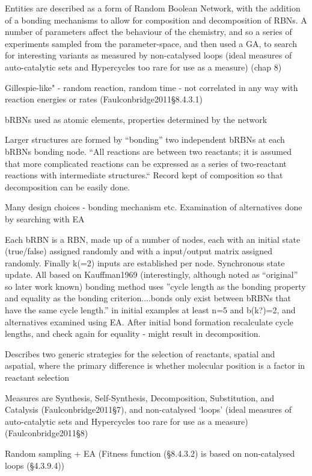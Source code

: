 Entities are described as a form of Random Boolean Network, with the addition of a bonding mechanisms to allow for composition and decomposition of RBNs. A number of parameters affect the behaviour of the chemistry, and so a series of experiments sampled from the parameter-space, and then used a GA, to search for interesting variants as measured by non-catalysed loops (ideal measures of auto-catalytic sets and Hypercycles too rare for use as a measure) (chap 8)

Gillespie-like" - random reaction, random time - not correlated in any way with reaction energies or rates (Faulconbridge2011§8.4.3.1)

bRBNs used as atomic elements, properties determined by the network

Larger structures are formed by ``bonding'' two independent bRBNs at each bRBNs bonding node. ``All reactions are between two reactants; it is assumed that more complicated reactions can be expressed as a series of two-reactant reactions with intermediate structures.`` Record kept of composition so that decomposition can be easily done.

Many design choices - bonding mechanism etc. Examination of alternatives done by searching with EA

Each bRBN is a RBN, made up of a number of nodes, each with an initial state (true/false) assigned randomly and with a input/output matrix assigned randomly. Finally k(=2) inputs are established per node. Synchronous state update. All based on Kauffman1969 (interestingly, although noted as ``original'' so later work known) bonding method uses ''cycle length as the bonding property and equality as the bonding criterion....bonds only exist between bRBNs that have the same cycle length.'' in initial examples at least n=5 and b(k?)=2, and alternatives examined using EA. After initial bond formation recalculate cycle lengths, and check again for equality - might result in decomposition.

Describes two generic strategies for the selection of reactants, spatial and aspatial, where the primary difference is whether molecular position is a factor in reactant selection

Measures are Synthesis, Self-Synthesis, Decomposition, Substitution, and Catalysis (Faulconbridge2011§7), and non-catalysed `loops' (ideal measures of auto-catalytic sets and Hypercycles too rare for use as a measure) (Faulconbridge2011§8)

Random sampling + EA (Fitness function (§8.4.3.2) is based on non-catalysed loops (§4.3.9.4))		

